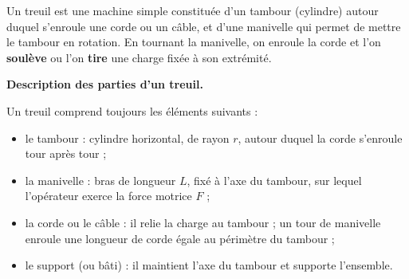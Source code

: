 \documentclass[11pt]{article}
\newcommand{\cle}[1]{{\popxbold\color{popdark}#1}}
\begin{document}
\begin{definition}[Le treuil]
Un \cle{treuil} est une machine simple constituée d'un \cle{tambour} (cylindre) autour duquel s'enroule une corde ou un câble, et d'une \cle{manivelle} qui permet de mettre le tambour en rotation. En tournant la manivelle, on enroule la corde et l'on \textbf{soulève} ou l'on \textbf{tire} une charge fixée à son extrémité.
\end{definition}

\textbf{Description des parties d'un treuil.}\par

Un treuil comprend toujours les éléments suivants :

\begin{itemize}
\item le \cle{tambour} : cylindre horizontal, de rayon $r$, autour duquel la corde s'enroule tour après tour ;
\item la \cle{manivelle} : bras de longueur $L$, fixé à l'axe du tambour, sur lequel l'opérateur exerce la force motrice $F$ ;
\item la \cle{corde} ou le \cle{câble} : il relie la charge au tambour ; un tour de manivelle enroule une longueur de corde égale au périmètre du tambour ;
\item le \cle{support} (ou bâti) : il maintient l'axe du tambour et supporte l'ensemble.
\end{itemize}
\end{document}
